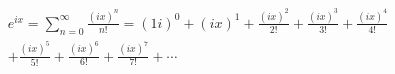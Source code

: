 \documentclass[preview]{standalone}
\begin{document}
\begin{align*}
e^{ix} = \sum_{n=0}^{\infty} \frac{(ix)^n}{n!} = (1i)^0 + (ix)^1 + \frac{(ix)^2}{2!} + \frac{(ix)^3}{3!} + \frac{(ix)^4}{4!} \\ + \frac{(ix)^5}{5!}+ \frac{(ix)^6}{6!} + \frac{(ix)^7}{7!} + \cdots
\end{align*}
\end{document}
